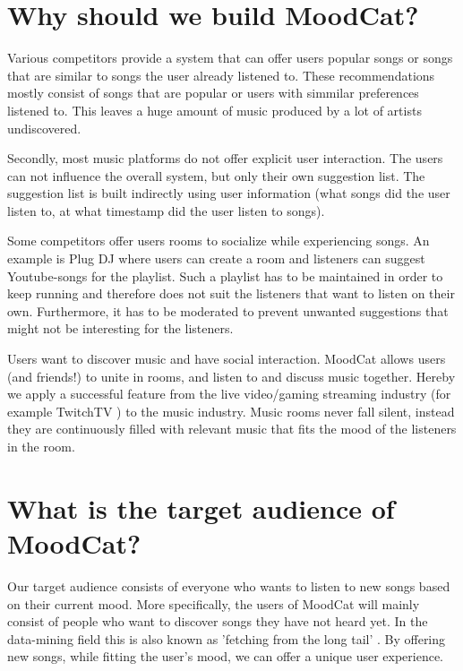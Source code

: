 \chapter{Why should we build MoodCat?}
Various competitors provide a system that can offer users popular songs or songs that are similar to songs the user already listened to.
These recommendations mostly consist of songs that are popular or users with simmilar preferences listened to.
This leaves a huge amount of music produced by a lot of artists undiscovered.

Secondly, most music platforms do not offer explicit user interaction.
The users can not influence the overall system, but only their own suggestion list.
The suggestion list is built indirectly using user information (what songs did the user listen to, at what timestamp did the user listen to songs).

Some competitors offer users rooms to socialize while experiencing songs.
An example is Plug DJ \cite{PlugDJ} where users can create a room and listeners can suggest Youtube-songs\cite{Youtube} for the playlist.
Such a playlist has to be maintained in order to keep running and therefore does not suit the listeners that want to listen on their own.
Furthermore, it has to be moderated to prevent unwanted suggestions that might not be interesting for the listeners.

\bigskip 

Users want to discover music and have social interaction.
MoodCat allows users (and friends!) to unite in rooms, and listen to and discuss music together.
Hereby we apply a successful feature from the live video/gaming streaming industry (for example TwitchTV \cite{Twitch}) to the music industry.
Music rooms never fall silent, instead they are continuously filled with relevant music that fits the mood of the listeners in the room.

\chapter{What is the target audience of MoodCat?}
Our target audience consists of everyone who wants to listen to new songs based on their current mood.
More specifically, the users of MoodCat will mainly consist of people who want to discover songs they have not heard yet.
In the data-mining field this is also known as 'fetching from the long tail' \cite{longtail}.
By offering new songs, while fitting the user's mood, we can offer a unique user experience.


